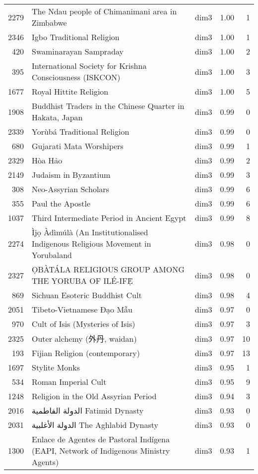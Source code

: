\begin{tabular}{rllrr}
2279 & The Ndau people of Chimanimani area in Zimbabwe & dim3 & 1.00 & 1 \\
2346 & Igbo Traditional Religion & dim3 & 1.00 & 1 \\
420 & Swaminarayan Sampraday & dim3 & 1.00 & 2 \\
395 & International Society for Krishna Consciousness (ISKCON) & dim3 & 1.00 & 3 \\
1677 & Royal Hittite Religion & dim3 & 1.00 & 5 \\
1908 & Buddhist Traders in the Chinese Quarter in Hakata, Japan & dim3 & 0.99 & 0 \\
2339 & Yorùbá Traditional Religion & dim3 & 0.99 & 0 \\
680 & Gujarati Mata Worshipers & dim3 & 0.99 & 1 \\
2329 & Hòa Hảo & dim3 & 0.99 & 2 \\
2149 & Judaism in Byzantium & dim3 & 0.99 & 3 \\
308 & Neo-Assyrian Scholars & dim3 & 0.99 & 6 \\
355 & Paul the Apostle & dim3 & 0.99 & 6 \\
1037 & Third Intermediate Period in Ancient Egypt & dim3 & 0.99 & 8 \\
2274 & Ìjọ Àdìmúlà (An Institutionalised Indigenous Religious Movement in Yorubaland & dim3 & 0.98 & 0 \\
2327 & ỌBÀTÁLA RELIGIOUS GROUP AMONG THE YORUBA OF ILÉ-IFẸ̀ & dim3 & 0.98 & 0 \\
869 & Sichuan Esoteric Buddhist Cult & dim3 & 0.98 & 4 \\
2051 & Tibeto-Vietnamese Đạo Mẫu & dim3 & 0.97 & 0 \\
970 & Cult of Isis (Mysteries of Isis) & dim3 & 0.97 & 3 \\
2325 & Outer alchemy (外丹, waidan) & dim3 & 0.97 & 10 \\
193 & Fijian Religion (contemporary) & dim3 & 0.97 & 13 \\
1697 & Stylite Monks & dim3 & 0.95 & 1 \\
534 & Roman Imperial Cult & dim3 & 0.95 & 9 \\
1248 & Religion in the Old Assyrian Period & dim3 & 0.94 & 3 \\
2016 & الدولة الفاطمية Fatimid Dynasty & dim3 & 0.93 & 0 \\
2031 & الدولة الأغلبية The Aghlabid Dynasty & dim3 & 0.93 & 0 \\
1300 & Enlace de Agentes de Pastoral Indígena (EAPI, Network of Indigenous Ministry Agents) & dim3 & 0.93 & 1 \\

\end{tabular}
